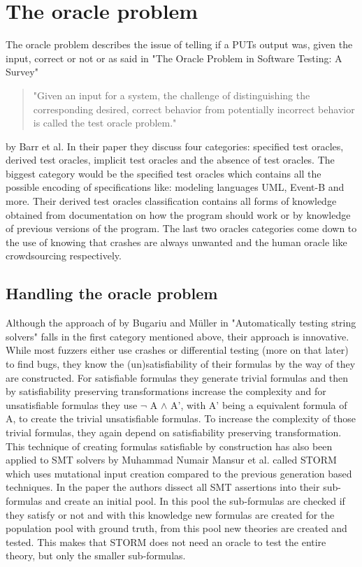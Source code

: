 \section{The oracle problem}
\label{cha:2:OracleProblem}
The oracle problem describes the issue of telling if a PUTs output was, given the input, correct or not or as said in "The Oracle Problem in Software Testing: A Survey" \cite{10barr2014oracleProblem} 
\begin{quote}
	"Given an input for a system, the challenge of distinguishing the corresponding desired, correct behavior from potentially incorrect behavior is called the test oracle problem."
\end{quote} by Barr et al.
In their paper they discuss four categories: specified test oracles, derived test oracles, implicit test oracles and the absence of test oracles. The biggest category would be the specified test oracles which contains all the possible encoding of specifications like: modeling languages UML, Event-B and more. Their derived test oracles classification contains all forms of knowledge obtained from documentation on how the program should work or by knowledge of previous versions of the program. The last two oracles categories come down to the use of knowing that crashes are always unwanted and the human oracle like crowdsourcing respectively.

\subsection{Handling the oracle problem}
\label{cha:2:handelingOracelproblem}
Although the approach of by Bugariu and M\"uller in "Automatically testing string solvers" \cite{9bugariu2020automaticallyTestingStringSolvers} falls in the first category mentioned above, their approach is innovative. While most fuzzers either use crashes or differential testing (more on that later) to find bugs, they know the (un)satisfiability of their formulas by the way of they are constructed. For satisfiable formulas they generate trivial formulas and then by satisfiability preserving transformations increase the complexity and for unsatisfiable formulas they use $\neg$ A $\land$ A', with A' being a equivalent formula of A, to create the trivial unsatisfiable formulas. To increase the complexity of those trivial formulas, they again depend on satisfiability preserving transformation. This technique of creating formulas satisfiable by construction has also been applied to SMT solvers by Muhammad Numair Mansur et al. called STORM \cite{1mansur2020detecting} which uses mutational input creation compared to the previous generation based techniques. In the paper the authors dissect all SMT assertions into their sub-formulas and create an initial pool. In this pool the sub-formulas are checked if they satisfy or not and with this knowledge new formulas are created for the population pool with ground truth, from this pool new theories are created and tested. This makes that STORM does not need an oracle to test the entire theory, but only the smaller sub-formulas.


